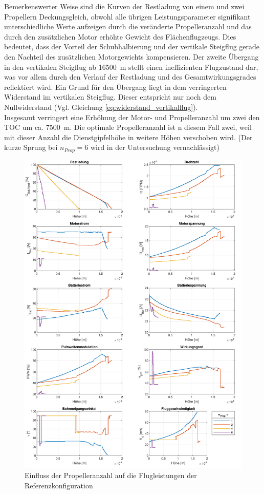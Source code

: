 Bemerkenswerter Weise sind die Kurven der Restladung von einem und zwei Propellern Deckungsgleich, obwohl alle übrigen Leistungsparameter signifikant unterschiedliche Werte aufzeigen durch die veränderte Propelleranzahl und das durch den zusätzlichen Motor erhöhte Gewicht des Flächenflugzeugs. Dies bedeutet, dass der Vorteil der Schubhalbierung und der vertikale Steigflug gerade den Nachteil des zusätzlichen Motorgewichts kompensieren. Der zweite Übergang in den vertikalen Steigflug ab \SI{16500}{m} stellt einen ineffizienten Flugzustand dar, was vor allem durch den Verlauf der Restladung und des Gesamtwirkungsgrades reflektiert wird. 
Ein Grund für den Übergang liegt in dem verringerten Widerstand im vertikalen Steigflug. Dieser entspricht nur noch dem Nullwiderstand (Vgl. Gleichung \ref{eq:widerstand_vertikalflug}). \\
Insgesamt verringert eine Erhöhung der Motor- und Propelleranzahl um zwei den TOC um ca. \SI{7500}{m}. Die optimale Propelleranzahl ist n diesem Fall zwei, weil mit dieser Anzahl die Dienstgipfelhöhe in weitere Höhen verschoben wird.
(Der kurze Sprung bei \ensuremath{n_{Prop} = 6} wird in der Untersuchung vernachlässigt)

\begin{figure}[H]
\centering
	\includegraphics[scale=0.7]{Diagramme/Flaechenflzg_n_prop.pdf}
	\caption{Einfluss der Propelleranzahl auf die Flugleistungen der Referenzkonfiguration}
	\label{abb:flaechenflzg_n_prop}
\end{figure}


